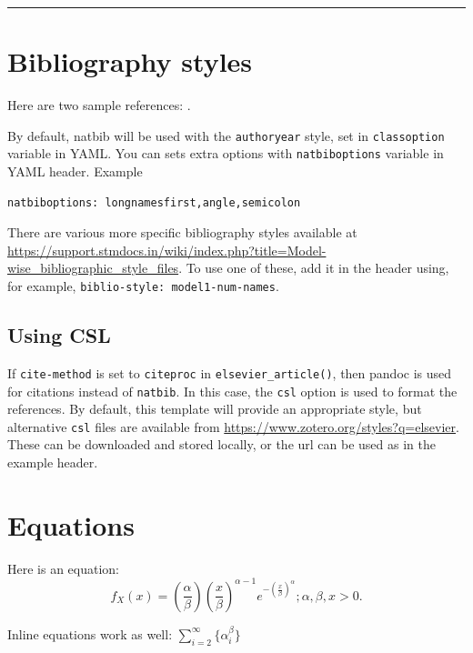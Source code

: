 \documentclass[
  super,
  preprint,
  3p]{elsarticle}
\begin{document}
\begin{center}\rule{0.5\linewidth}{0.5pt}\end{center}

\section{Bibliography styles}\label{bibliography-styles}

Here are two sample references: \citet{Feynman1963118}
\citet{Dirac1953888}.

By default, natbib will be used with the \texttt{authoryear} style, set
in \texttt{classoption} variable in YAML. You can sets extra options
with \texttt{natbiboptions} variable in YAML header. Example

\begin{verbatim}
natbiboptions: longnamesfirst,angle,semicolon
\end{verbatim}

There are various more specific bibliography styles available at
\url{https://support.stmdocs.in/wiki/index.php?title=Model-wise_bibliographic_style_files}.
To use one of these, add it in the header using, for example,
\texttt{biblio-style:\ model1-num-names}.

\subsection{Using CSL}\label{using-csl}

If \texttt{cite-method} is set to \texttt{citeproc} in
\texttt{elsevier\_article()}, then pandoc is used for citations instead
of \texttt{natbib}. In this case, the \texttt{csl} option is used to
format the references. By default, this template will provide an
appropriate style, but alternative \texttt{csl} files are available from
\url{https://www.zotero.org/styles?q=elsevier}. These can be downloaded
and stored locally, or the url can be used as in the example header.

\section{Equations}\label{equations}

Here is an equation: \[ 
  f_{X}(x) = \left(\frac{\alpha}{\beta}\right)
  \left(\frac{x}{\beta}\right)^{\alpha-1}
  e^{-\left(\frac{x}{\beta}\right)^{\alpha}}; 
  \alpha,\beta,x > 0 .
\]

Inline equations work as well: \(\sum_{i = 2}^\infty\{\alpha_i^\beta\}\)
\end{document}
